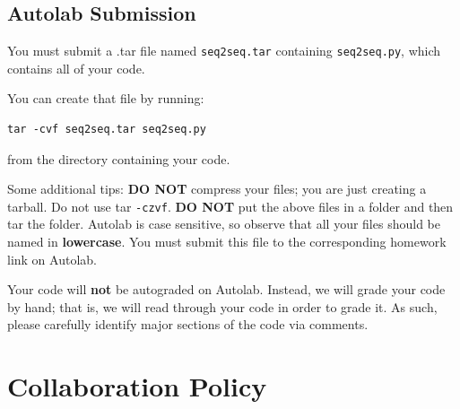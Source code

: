 \documentclass[11pt,addpoints,answers]{exam}
\numberwithin{equation}{section} %
\numberwithin{figure}{section} %
\numberwithin{table}{section} %
\begin{document}
\subsection{Autolab Submission}
You must submit a .tar file named \lstinline{seq2seq.tar} containing \lstinline{seq2seq.py}, which contains all of your code.

You can create that file by running:
\begin{lstlisting}
tar -cvf seq2seq.tar seq2seq.py
\end{lstlisting}
from the directory containing your code.

Some additional tips: {\bf DO NOT} compress your files; you are just
creating a tarball. Do not use tar \texttt{-czvf}.  {\bf DO NOT} put
the above files in a folder and then tar the folder.  Autolab is case
sensitive, so observe that all your files should be named in {\bf
  lowercase}. You must submit this file to the corresponding homework
link on Autolab. 

Your code will \textbf{not} be autograded on Autolab. Instead, we will grade your code by hand; that is, we will read through your code in order to grade it. As such, please carefully identify major sections of the code via comments. 

\clearpage

\section{Collaboration Policy}
\end{document}
